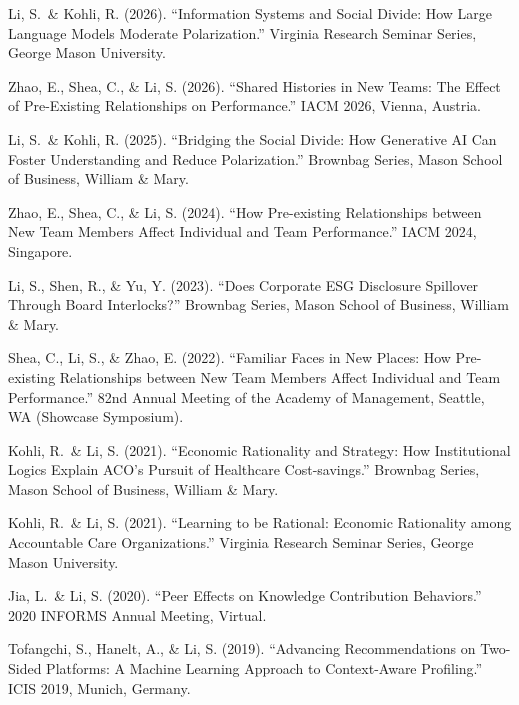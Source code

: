 \documentclass[11pt, letterpaper]{article}
\begin{document}
\begin{publist}
  \item Li, S.\ \& Kohli, R. (2026). ``Information Systems and Social Divide: How Large Language Models Moderate Polarization.'' Virginia Research Seminar Series, George Mason University.

  \item Zhao, E., Shea, C., \& Li, S. (2026). ``Shared Histories in New Teams: The Effect of Pre-Existing Relationships on Performance.'' IACM 2026, Vienna, Austria.

  \item Li, S.\ \& Kohli, R. (2025). ``Bridging the Social Divide: How Generative AI Can Foster Understanding and Reduce Polarization.'' Brownbag Series, Mason School of Business, William \& Mary.

  \item Zhao, E., Shea, C., \& Li, S. (2024). ``How Pre-existing Relationships between New Team Members Affect Individual and Team Performance.'' IACM 2024, Singapore.

  \item Li, S., Shen, R., \& Yu, Y. (2023). ``Does Corporate ESG Disclosure Spillover Through Board Interlocks?'' Brownbag Series, Mason School of Business, William \& Mary.

  \item Shea, C., Li, S., \& Zhao, E. (2022). ``Familiar Faces in New Places: How Pre-existing Relationships between New Team Members Affect Individual and Team Performance.'' 82nd Annual Meeting of the Academy of Management, Seattle, WA (Showcase Symposium).

  \item Kohli, R.\ \& Li, S. (2021). ``Economic Rationality and Strategy: How Institutional Logics Explain ACO's Pursuit of Healthcare Cost-savings.'' Brownbag Series, Mason School of Business, William \& Mary.

  \item Kohli, R.\ \& Li, S. (2021). ``Learning to be Rational: Economic Rationality among Accountable Care Organizations.'' Virginia Research Seminar Series, George Mason University.

  \item Jia, L.\ \& Li, S. (2020). ``Peer Effects on Knowledge Contribution Behaviors.'' 2020 INFORMS Annual Meeting, Virtual.

  \item Tofangchi, S., Hanelt, A., \& Li, S. (2019). ``Advancing Recommendations on Two-Sided Platforms: A Machine Learning Approach to Context-Aware Profiling.'' ICIS 2019, Munich, Germany.


\end{publist}
\end{document}
